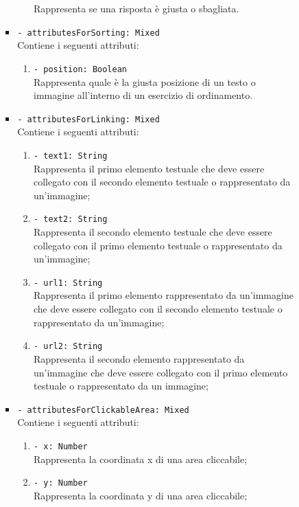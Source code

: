 \begin{itemize}
\begin{itemize}
\begin{itemize}
\begin{itemize}
\begin{enumerate}
							Rappresenta se una risposta è giusta o sbagliata.
						\end{enumerate}      
						\item \texttt{- attributesForSorting: Mixed}\\
						Contiene i seguenti attributi:
						\begin{enumerate}
							\item \texttt{- position: Boolean}\\
							Rappresenta quale è la giusta posizione di un testo o immagine all'interno di un esercizio di ordinamento.
						\end{enumerate}  
						\item \texttt{- attributesForLinking: Mixed}\\
						Contiene i seguenti attributi:
						\begin{enumerate}
							\item \texttt{- text1: String}\\
							Rappresenta il primo elemento testuale che deve essere collegato con il secondo elemento testuale o rappresentato da un'immagine;
							\item \texttt{- text2: String}\\
							Rappresenta il secondo elemento testuale che deve essere collegato con il primo elemento testuale o rappresentato da un'immagine;
							\item \texttt{- url1: String}\\
							Rappresenta il primo elemento rappresentato da un'immagine che deve essere collegato con il secondo elemento testuale o rappresentato da un'immagine;
							\item \texttt{- url2: String}\\
							Rappresenta il secondo elemento rappresentato da un'immagine che deve essere collegato con il primo elemento testuale o rappresentato da un immagine;
						\end{enumerate}  
						\item \texttt{- attributesForClickableArea: Mixed}\\
						Contiene i seguenti attributi:
						\begin{enumerate}
							\item \texttt{- x: Number}\\
							Rappresenta la coordinata x di una area cliccabile;  
							\item \texttt{- y: Number}\\
							Rappresenta la coordinata y di una area cliccabile;  

\end{enumerate}
\end{itemize}
\end{itemize}
\end{itemize}
\end{itemize}
